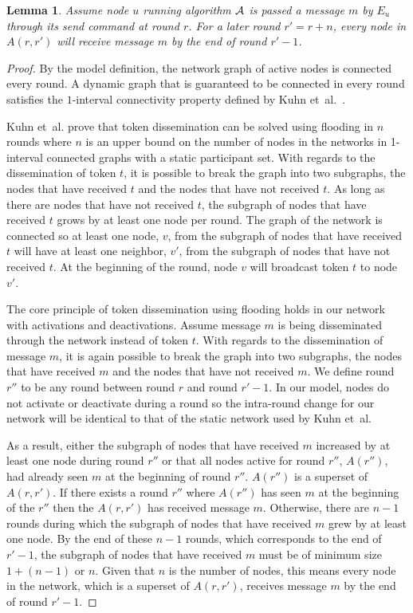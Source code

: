 \documentclass[english]{article}
\newtheorem{lemma}[theorem]{Lemma}
\begin{document}
\begin{lemma}
\label{RBDeactivationReceive}
Assume node $u$ running algorithm $\cal A$ is passed a message $m$ by $E_u$ through its \textit{send} command at round $r$. For a later round $r' = r + n$, every node in $A(r,r')$ will receive message $m$ by the end of round $r'-1$.
\end{lemma}
\begin{proof}

By the model definition, the network graph of active nodes is connected every round. A dynamic graph that is guaranteed to be connected in every round satisfies the $1$-interval connectivity property defined by Kuhn et~al.~\cite{Kuhn:2010}.

Kuhn et~al. prove that token dissemination can be solved using flooding in $n$ rounds where $n$ is an upper bound on the number of nodes in the networks in 1-interval connected graphs with a static participant set. With regards to the dissemination of token $t$, it is possible to break the graph into two subgraphs, the nodes that have received $t$ and the nodes that have not received $t$. As long as there are nodes that have not received $t$, the subgraph of nodes that have received $t$ grows by at least one node per round. The graph of the network is connected so at least one node, $v$, from the subgraph of nodes that have received $t$ will have at least one neighbor, $v'$, from the subgraph of nodes that have not received $t$. At the beginning of the round, node $v$ will broadcast token $t$ to node $v'$.

The core principle of token dissemination using flooding holds in our network with activations and deactivations. Assume message $m$ is being disseminated through the network instead of token $t$. With regards to the dissemination of message $m$, it is again possible to break the graph into two subgraphs, the nodes that have received $m$ and the nodes that have not received $m$. We define round $r''$ to be any round between round $r$ and round $r'-1$. In our model, nodes do not activate or deactivate during a round so the intra-round change for our network will be identical to that of the static network used by Kuhn et~al. 

As a result, either the subgraph of nodes that have received $m$ increased by at least one node during round $r''$ or that all nodes active for round $r''$, $A(r'')$, had already seen $m$ at the beginning of round $r''$. $A(r'')$ is a superset of $A(r,r')$. If there exists a round $r''$ where $A(r'')$ has seen $m$ at the beginning of the $r''$ then the $A(r,r')$ has received message $m$. Otherwise, there are $n-1$ rounds during which the subgraph of nodes that have received $m$ grew by at least one node. By the end of these $n-1$ rounds, which corresponds to the end of $r'-1$, the subgraph of nodes that have received $m$ must be of minimum size $1 + (n-1)$ or $n$. Given that $n$ is the number of nodes, this means every node in the network, which is a superset of $A(r,r')$, receives message $m$ by the end of round $r'-1$.


\end{proof}
\end{document}

